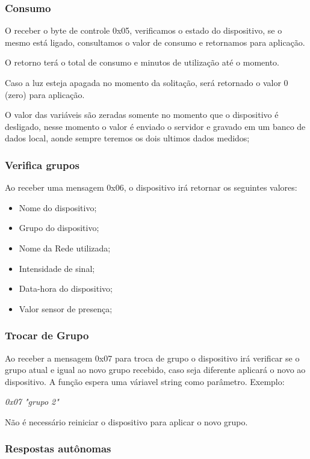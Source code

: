 \documentclass[openright]{normas-utf-tex} %
\begin{document}
\subsubsection{Consumo}
O receber o byte de controle 0x05, verificamos o estado do dispositivo, se o mesmo está ligado, consultamos o valor de consumo e retornamos para aplicação.

O retorno terá o total de consumo e minutos de utilização até o momento.

Caso a luz esteja apagada no momento da solitação, será retornado o valor 0 (zero) para aplicação.

O valor das variáveis são zeradas somente no momento que o dispositivo é desligado, nesse momento o valor é enviado o servidor e gravado em um banco de dados local, aonde sempre teremos os dois ultimos dados medidos;

\subsubsection{Verifica grupos}

Ao receber uma mensagem 0x06, o dispositivo irá retornar os seguintes valores:

\begin{itemize}
    \item Nome do dispositivo;
    \item Grupo do dispositivo;
    \item Nome da Rede utilizada;
    \item Intensidade de sinal;
    \item Data-hora do dispositivo;
    \item Valor sensor de presença;
\end{itemize}

\subsubsection{Trocar de Grupo}
Ao receber a mensagem 0x07 para troca de grupo o dispositivo irá verificar se o grupo atual e igual ao novo grupo recebido, caso seja diferente aplicará o novo ao dispositivo.
A função espera uma váriavel string\cite{Altabooks} como parâmetro.
Exemplo:
\begin{center}
    \textit{
    0x07 "grupo 2"
    }
\end{center}

Não é necessário reiniciar o dispositivo para aplicar o novo grupo.

\subsubsection{Respostas autônomas}
\end{document}
